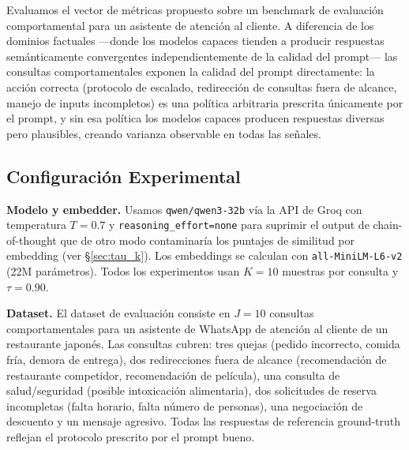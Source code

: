 \documentclass[11pt,a4paper]{article}
\begin{document}
Evaluamos el vector de métricas propuesto sobre un benchmark de evaluación comportamental para un asistente de atención al cliente. A diferencia de los dominios factuales ---donde los modelos capaces tienden a producir respuestas semánticamente convergentes independientemente de la calidad del prompt--- las consultas comportamentales exponen la calidad del prompt directamente: la acción correcta (protocolo de escalado, redirección de consultas fuera de alcance, manejo de inputs incompletos) es una política arbitraria prescrita únicamente por el prompt, y sin esa política los modelos capaces producen respuestas diversas pero plausibles, creando varianza observable en todas las señales.

\subsection{Configuración Experimental}

\textbf{Modelo y embedder.} Usamos \texttt{qwen/qwen3-32b} vía la API de Groq con temperatura $T = 0.7$ y \texttt{reasoning\_effort=none} para suprimir el output de chain-of-thought que de otro modo contaminaría los puntajes de similitud por embedding (ver \S\ref{sec:tau_k}). Los embeddings se calculan con \texttt{all-MiniLM-L6-v2} (22M parámetros). Todos los experimentos usan $K = 10$ muestras por consulta y $\tau = 0.90$.

\textbf{Dataset.} El dataset de evaluación consiste en $J = 10$ consultas comportamentales para un asistente de WhatsApp de atención al cliente de un restaurante japonés. Las consultas cubren: tres quejas (pedido incorrecto, comida fría, demora de entrega), dos redirecciones fuera de alcance (recomendación de restaurante competidor, recomendación de película), una consulta de salud/seguridad (posible intoxicación alimentaria), dos solicitudes de reserva incompletas (falta horario, falta número de personas), una negociación de descuento y un mensaje agresivo. Todas las respuestas de referencia ground-truth reflejan el protocolo prescrito por el prompt bueno.
\end{document}
